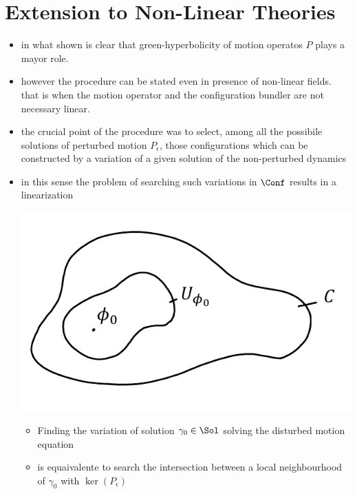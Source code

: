 \documentclass[a4paper,11pt]{scrartcl}
\begin{document}
	\section{Extension to Non-Linear Theories}
	\begin{itemize}
		\item in what shown is clear that green-hyperbolicity of motion operatos $P$ plays a mayor role.
		\item however the procedure can be stated even in presence of non-linear fields.\\
		that is when the motion operator and the configuration bundler are not necessary linear.
		\item the crucial point of the procedure was to select, among all the possibile solutions of perturbed motion $P_\epsilon$, those configurations which can be constructed by a variation of a given solution of the non-perturbed dynamics
		\item in this sense the problem of searching such variations in $\Conf$ results in a linearization\\
		\begin{minipage}{0.4\textwidth}
			   	\includegraphics[width=\textwidth]{../Pictures/Linearization} 
		\end{minipage}
		\begin{minipage}{0.5\textwidth}
			\begin{itemize} 
				\item Finding the variation of solution $\gamma_0\in \Sol$ solving the disturbed motion equation
				\item is equaivalente to search the intersection between a local neighbourhood of $\gamma_0$ with $\ker(P_\epsilon)$
			\end{itemize}
		\end{minipage}	

\end{itemize}
\end{document}
